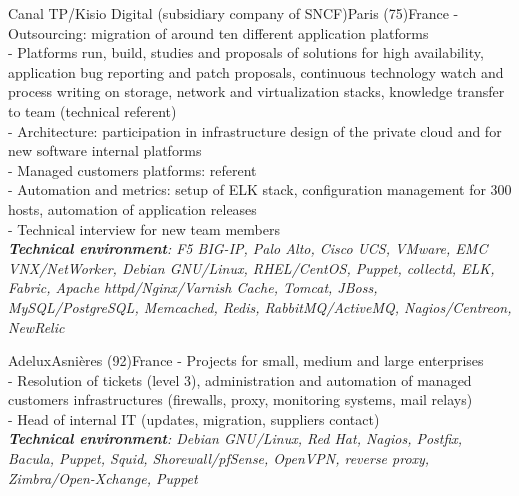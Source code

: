 \documentclass[10pt,a4paper]{moderncv}
\begin{document}
{Canal TP/Kisio Digital (subsidiary company of SNCF)}{Paris (75)}{France}
{
- Outsourcing: migration of around ten different application platforms\\
- Platforms run, build, studies and proposals of solutions for high availability, application bug reporting and patch proposals, continuous technology watch and process writing on storage, network and virtualization stacks, knowledge transfer to team (technical referent)\\
- Architecture: participation in infrastructure design of the private cloud and for new software internal platforms\\
- Managed customers platforms: referent\\
- Automation and metrics: setup of ELK stack, configuration management for 300 hosts, automation of application releases\\
- Technical interview for new team members\\
\newline{}
\textit{\textbf{Technical environment}: F5 BIG-IP, Palo Alto, Cisco UCS, VMware, EMC VNX/NetWorker, Debian GNU/Linux, RHEL/CentOS, Puppet, collectd, ELK, Fabric, Apache httpd/Nginx/Varnish Cache, Tomcat, JBoss, MySQL/PostgreSQL, Memcached, Redis, RabbitMQ/ActiveMQ, Nagios/Centreon, NewRelic}
\newline{}
}

{Adelux}{Asnières (92)}{France}
{
- Projects for small, medium and large enterprises\\
- Resolution of tickets (level 3), administration and automation of managed customers infrastructures (firewalls, proxy, monitoring systems, mail relays)\\
- Head of internal IT (updates, migration, suppliers contact)\\
\newline{}
\textit{\textbf{Technical environment}: Debian GNU/Linux, Red Hat, Nagios, Postfix, Bacula, Puppet, Squid, Shorewall/pfSense, OpenVPN, reverse proxy, Zimbra/Open-Xchange, Puppet}
\newline{}
}
\end{document}
